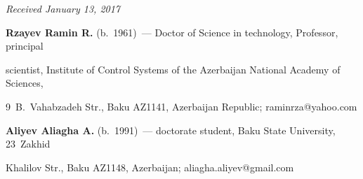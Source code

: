 {{

} }





\vspace*{-3pt}



\hfill{\small\textit{Received January 13, 2017}}

     

     

     \Contr

     

\noindent

\textbf{Rzayev Ramin R.} (b.\ 1961)~--- Doctor of Science in technology, Professor, principal 

scientist, Institute of Control Systems of the Azerbaijan National Academy of Sciences, 

9~B.~Vahabzadeh Str., Baku AZ1141, Azerbaijan Republic; \mbox{raminrza@yahoo.com}



\vspace*{3pt}



\noindent

\textbf{Aliyev Aliagha A.} (b.\ 1991)~--- doctorate student, Baku State University, 23~Zakhid 

Khalilov Str., Baku AZ1148, Azerbaijan; \mbox{aliagha.aliyev@gmail.com}

     

\label{end\stat}





\renewcommand{\bibname}{\protect\rm Литература}

